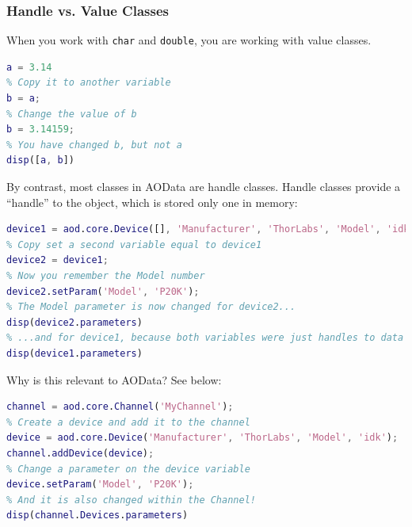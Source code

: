 \documentclass[10pt]{exam}
\newcommand\myurl[1]{\textcolor{blue}{\underline{#1}}}
\newcommand\matclass[1]{\textcolor{codeblue}{\texttt{#1}}}
\begin{document}
	\subsubsection{Handle vs. Value Classes}\label{subsubsection:HandleValue}
		\noindent When you work with \matclass{char} and \matclass{double}, you are working with value classes. 
		\begin{lstlisting}[language=matlab]
% Create a double variable
a = 3.14
% Copy it to another variable
b = a;
% Change the value of b
b = 3.14159;
% You have changed b, but not a
disp([a, b])
	\end{lstlisting}
	\noindent By contrast, most classes in AOData are handle classes. Handle classes provide a ``handle'' to the object, which is stored only one in memory:
	\begin{lstlisting}[language=matlab]
% Create a standalone Device class. It's from ThorLabs but you don't remember the Model
device1 = aod.core.Device([], 'Manufacturer', 'ThorLabs', 'Model', 'idk');
% Copy set a second variable equal to device1
device2 = device1;
% Now you remember the Model number
device2.setParam('Model', 'P20K');
% The Model parameter is now changed for device2...
disp(device2.parameters)
% ...and for device1, because both variables were just handles to data that exists only once in memory
disp(device1.parameters)
		\end{lstlisting}
		\noindent Why is this relevant to AOData? See below:
		\begin{lstlisting}[language=matlab]
% Create a channel
channel = aod.core.Channel('MyChannel');
% Create a device and add it to the channel
device = aod.core.Device('Manufacturer', 'ThorLabs', 'Model', 'idk');
channel.addDevice(device);
% Change a parameter on the device variable
device.setParam('Model', 'P20K');
% And it is also changed within the Channel!
disp(channel.Devices.parameters)
		\end{lstlisting}
	
\end{document}
